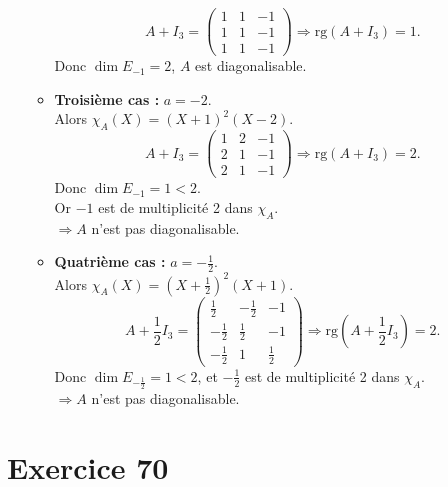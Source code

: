 \documentclass[a4paper,12pt,oneside]{book}
\newenvironment{solution}{\begin{solutionbox}}{\end{solutionbox}}
\begin{document}
\begin{solution}
\begin{enumerate}
\begin{itemize}
			\[
			A + I_3 = \begin{pmatrix}
				1 & 1 & -1 \\
				1 & 1 & -1 \\
				1 & 1 & -1
			\end{pmatrix}
			\Rightarrow \mathrm{rg}(A + I_3) = 1.
			\]
			Donc \(\dim E_{-1} = 2\), \(A\) est diagonalisable.
			
			\item \textbf{Troisième cas :} \(a = -2\).\\
			Alors \(\chi_A(X) = (X + 1)^2 (X - 2)\).\\
			\[
			A + I_3 = \begin{pmatrix}
				1 & 2 & -1 \\
				2 & 1 & -1 \\
				2 & 1 & -1
			\end{pmatrix}
			\Rightarrow \mathrm{rg}(A + I_3) = 2.
			\]
			Donc \(\dim E_{-1} = 1 < 2\).\\
			Or \(-1\) est de multiplicité 2 dans \(\chi_A\).\\
			\(\Rightarrow A\) n’est pas diagonalisable.
			
			\item \textbf{Quatrième cas :} \(a = -\frac{1}{2}\).\\
			Alors \(\chi_A(X) = \left(X + \frac{1}{2}\right)^2(X + 1)\).\\
			\[
			A + \frac{1}{2} I_3 = \begin{pmatrix}
				\frac{1}{2} & -\frac{1}{2} & -1 \\
				-\frac{1}{2} & \frac{1}{2} & -1 \\
				-\frac{1}{2} & 1 & \frac{1}{2}
			\end{pmatrix}
			\Rightarrow \mathrm{rg}\left(A + \frac{1}{2} I_3\right) = 2.
			\]
			Donc \(\dim E_{-\frac{1}{2}} = 1 < 2\), et \(-\frac{1}{2}\) est de multiplicité 2 dans \(\chi_A\).\\
			\(\Rightarrow A\) n’est pas diagonalisable.
		\end{itemize}
	\end{enumerate}
\end{solution}


	\section*{Exercice 70}
	
\end{document}
